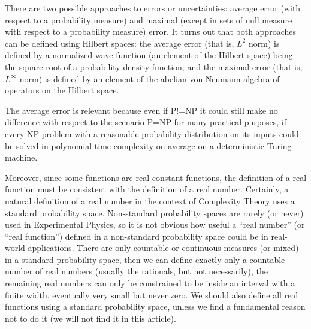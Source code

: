 \documentclass[11pt]{book}
\begin{document}
There are two possible approaches to errors or
uncertainties\cite{novak2008tractability}\cite{hennig2022probabilistic}\cite{ritter2000average}\cite{bna}: average error (with
respect to a probability measure) and maximal (except in sets of null
measure with respect to a probability measure) error. It turns out that
both approaches can be defined using Hilbert spaces: the average error
(that is, \(L^2\) norm) is defined by a normalized wave-function (an
element of the Hilbert space) being the square-root of a probability
density function; and the maximal error (that is, \(L^\infty\) norm) is
defined by an element of the abelian von Neumann algebra of operators on
the Hilbert space.

The average error is relevant because even if P!=NP it could still make
no difference with respect to the scenario P=NP for many practical
purposes, if every NP problem with a reasonable probability distribution
on its inputs could be solved in polynomial time-complexity on average
on a deterministic Turing
machine\cite{avcomplete}\cite{impagliazzo1995personal}.

Moreover, since some functions are real constant functions, the
definition of a real function must be consistent with the definition of
a real number. Certainly, a natural definition of a real number in the
context of Complexity Theory uses a standard probability space.
Non-standard probability spaces are rarely (or never) used in
Experimental Physics, so it is not obvious how useful a ``real number''
(or ``real function'') defined in a non-standard probability space could
be in real-world applications. There are only countable or continuous
measures (or mixed) in a standard probability space, then we can define
exactly only a countable number of real numbers (usually the rationals,
but not necessarily), the remaining real numbers can only be constrained
to be inside an interval with a finite width, eventually very small but
never zero. We should also define all real functions using a standard
probability space, unless we find a fundamental reason not to do it (we
will not find it in this article).
\end{document}
